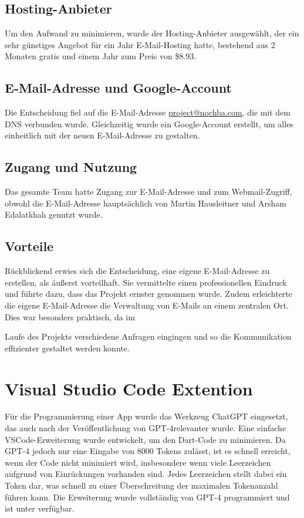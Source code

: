 \subsection{Hosting-Anbieter}
Um den Aufwand zu minimieren, wurde der Hosting-Anbieter \cite{namecheap} ausgewählt, der ein sehr günstiges Angebot für ein Jahr E-Mail-Hosting hatte, bestehend aus 2 Monaten gratis und einem Jahr zum Preis von \$8.93.

\subsection{E-Mail-Adresse und Google-Account}
Die Entscheidung fiel auf die E-Mail-Adresse
\href{mailto:project@nochba.com}{project@nochba.com}, die mit dem DNS verbunden wurde.
Gleichzeitig wurde ein Google-Account erstellt, um alles
einheitlich mit der neuen E-Mail-Adresse zu gestalten.

\subsection{Zugang und Nutzung}
Das gesamte Team hatte Zugang zur E-Mail-Adresse und zum Webmail-Zugriff, obwohl die E-Mail-Adresse hauptsächlich von Martin Hausleitner und Arsham Edalatkhah genutzt wurde.

\subsection{Vorteile}
Rückblickend erwies sich die Entscheidung, eine eigene
E-Mail-Adresse zu erstellen, als äußerst vorteilhaft. Sie
vermittelte einen professionellen Eindruck und führte dazu,
dass das Projekt ernster genommen wurde. Zudem erleichterte
die eigene E-Mail-Adresse die Verwaltung von E-Mails an
einem zentralen Ort. Dies war besonders praktisch, da im


Laufe des Projekts verschiedene Anfragen eingingen und so
die Kommunikation effizienter gestaltet werden konnte.


\section{Visual Studio Code Extention}

Für die Programmierung einer App wurde das Werkzeug ChatGPT
eingesetzt, das auch nach der Veröffentlichung von
GPT-4relevanter wurde.  Eine einfache VSCode-Erweiterung
wurde entwickelt, um den Dart-Code zu minimieren. Da GPT-4
jedoch nur eine Eingabe von 8000 Tokens zulässt, ist es
schnell erreicht, wenn der Code nicht minimiert wird,
insbesondere wenn viele Leerzeichen aufgrund von
Einrückungen vorhanden sind. Jedes Leerzeichen stellt dabei
ein Token dar, was schnell zu einer Überschreitung der
maximalen Tokenanzahl führen kann. Die Erweiterung wurde
vollständig von GPT-4 programmiert und ist unter
\cite{copyminify} verfügbar.

